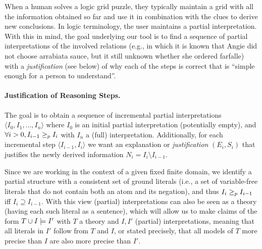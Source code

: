 
When a human solves a logic grid puzzle, they typically maintain a grid with all the information obtained so far and use it in combination with the clues to derive new conclusions. In logic terminology, the user maintains a partial interpretation.  
With this in mind, the goal underlying our tool is to find a sequence of partial interpretations of the involved relations (e.g., in which it is known that Angie did not choose arrabiata sauce, but it still unknown whether she ordered farfalle) with a 
\emph{justification} (see below) of why each of the steps is correct that is ``simple enough for a person to understand''. 


\paragraph{Justification of Reasoning Steps.}
The goal is to obtain a sequence of incremental partial interpretations $\langle I_0, I_1, \ldots, I_n \rangle$ where $I_0$ is an initial partial interpretation (potentially empty), and $\forall i>0, I_{i-1} \geq_p I_{i}$ with $I_n$ a (full) interpretation.
Additionally, for each incremental step $\langle I_{i-1}, I_i \rangle$ we want an explanation or \textit{justification} $(E_i,S_i)$ that justifies the newly derived information $N_i = I_i \setminus I_{i-1}$.

Since we are working in the context of a given fixed finite domain, we identify a partial structure with a consistent set of ground literals (i.e., a set of variable-free literals that do not contain both an atom and its negation), and thus $I_i\geq_p I_{i-1}$ iff $I_i\supseteq I_{i-1}$.
With this view (partial) interpretations can also be seen as a theory (having each such literal as a sentence), which will allow us to make claims of the form 
$T\cup I \models I'$ with $T$ a theory and  $I,I'$ (partial) interpretations, meaning that all literals in $I'$ follow from $T$ and $I$, or stated precisely, that all models of $T$ more precise than $I$ are also more precise than $I'$. 

